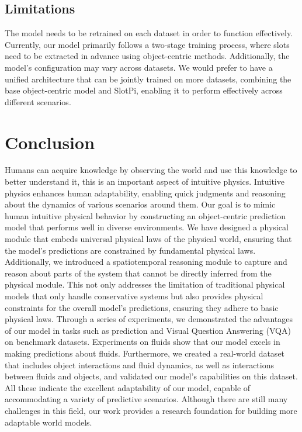 \documentclass[sigconf]{acmart}
\begin{document}
\subsection{Limitations}

The model needs to be retrained on each dataset in order to function effectively. Currently, our model primarily follows a two-stage training process, where slots need to be extracted in advance using object-centric methods. Additionally, the model's configuration may vary across datasets. We would prefer to have a unified architecture that can be jointly trained on more datasets, combining the base object-centric model and SlotPi, enabling it to perform effectively across different scenarios.


\section{Conclusion}

Humans can acquire knowledge by observing the world and use this knowledge to better understand it, this is an important aspect of intuitive physics. Intuitive physics enhances human adaptability, enabling quick judgments and reasoning about the dynamics of various scenarios around them. Our goal is to mimic human intuitive physical behavior by constructing an object-centric prediction model that performs well in diverse environments. We have designed a physical module that embeds universal physical laws of the physical world, ensuring that the model's predictions are constrained by fundamental physical laws. Additionally, we introduced a spatiotemporal reasoning module to capture and reason about parts of the system that cannot be directly inferred from the physical module. This not only addresses the limitation of traditional physical models that only handle conservative systems but also provides physical constraints for the overall model's predictions, ensuring they adhere to basic physical laws. Through a series of experiments, we demonstrated the advantages of our model in tasks such as prediction and Visual Question Answering (VQA) on benchmark datasets. Experiments on fluids show that our model excels in making predictions about fluids. Furthermore, we created a real-world dataset that includes object interactions and fluid dynamics, as well as interactions between fluids and objects, and validated our model's capabilities on this dataset. All these indicate the excellent adaptability of our model, capable of accommodating a variety of predictive scenarios. Although there are still many challenges in this field, our work provides a research foundation for building more adaptable world models.
\end{document}
